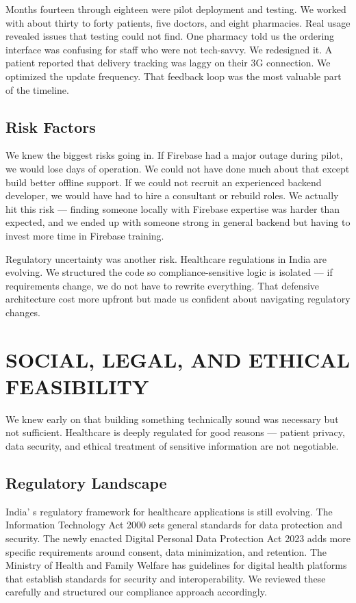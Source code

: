 \documentclass[12pt,a4paper]{report}
\begin{document}
\begin{itemize}
Months fourteen through eighteen were pilot deployment and testing. We worked with about thirty to forty patients, five doctors, and eight pharmacies. Real usage revealed issues that testing could not find. One pharmacy told us the ordering interface was confusing for staff who were not tech-savvy. We redesigned it. A patient reported that delivery tracking was laggy on their 3G connection. We optimized the update frequency. That feedback loop was the most valuable part of the timeline.

\subsection{Risk Factors}

We knew the biggest risks going in. If Firebase had a major outage during pilot, we would lose days of operation. We could not have done much about that except build better offline support. If we could not recruit an experienced backend developer, we would have had to hire a consultant or rebuild roles. We actually hit this risk — finding someone locally with Firebase expertise was harder than expected, and we ended up with someone strong in general backend but having to invest more time in Firebase training.

Regulatory uncertainty was another risk. Healthcare regulations in India are evolving. We structured the code so compliance-sensitive logic is isolated — if requirements change, we do not have to rewrite everything. That defensive architecture cost more upfront but made us confident about navigating regulatory changes.

\section{SOCIAL, LEGAL, AND ETHICAL FEASIBILITY}

We knew early on that building something technically sound was necessary but not sufficient. Healthcare is deeply regulated for good reasons — patient privacy, data security, and ethical treatment of sensitive information are not negotiable.

\subsection{Regulatory Landscape}

India' s regulatory framework for healthcare applications is still evolving. The Information Technology Act 2000 sets general standards for data protection and security. The newly enacted Digital Personal Data Protection Act 2023 adds more specific requirements around consent, data minimization, and retention. The Ministry of Health and Family Welfare has guidelines for digital health platforms that establish standards for security and interoperability. We reviewed these carefully and structured our compliance approach accordingly.


\end{itemize}
\end{document}
